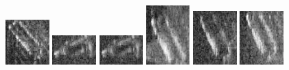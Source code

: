 \begin{figure}
    \includegraphics[width=0.15\textwidth]{chapters/images/dataset/all-class-images/bottle/bottle-155.jpg}
    \includegraphics[width=0.15\textwidth]{chapters/images/dataset/all-class-images/bottle/bottle-113.jpg}
    \includegraphics[width=0.15\textwidth]{chapters/images/dataset/all-class-images/bottle/bottle-107.jpg}
    \includegraphics[width=0.15\textwidth]{chapters/images/dataset/all-class-images/bottle/bottle-410.jpg}
    \includegraphics[width=0.15\textwidth]{chapters/images/dataset/all-class-images/bottle/bottle-271.jpg}
    \includegraphics[width=0.15\textwidth]{chapters/images/dataset/all-class-images/bottle/bottle-237.jpg}
    

\end{figure}
